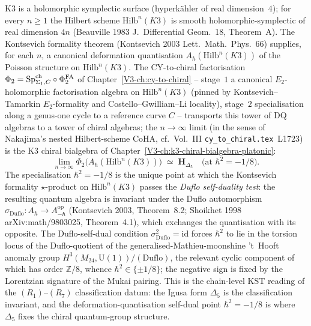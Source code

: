 \begin{remark}
\label{rem:mc5clmp-kst-dq}
\ClaimStatusConditional
K3 is a holomorphic symplectic surface (hyperk\"ahler of real
dimension~$4$); for every $n\ge 1$ the Hilbert scheme $\mathrm{Hilb}^n(K3)$
is smooth holomorphic-symplectic of real dimension $4n$
(Beauville 1983 \textup{J.~Differential Geom.}~18, Theorem~A). The
Kontsevich formality theorem (Kontsevich 2003
\textup{Lett.~Math.~Phys.}~66) supplies, for each $n$, a canonical
deformation quantisation $A_\hbar(\mathrm{Hilb}^n(K3))$ of the Poisson
structure on $\mathrm{Hilb}^n(K3)$. The CY-to-chiral factorisation
$\Phi_2 = \mathrm{Sp}^{\mathrm{ch}}_{\Sigma_1, C} \circ \Phi^{\mathrm{FA}}_2$ of
Chapter~\ref{V3-ch:cy-to-chiral} -- stage~$1$ a canonical
$E_2$-holomorphic factorisation algebra on $\mathrm{Hilb}^n(K3)$
(pinned by Kontsevich--Tamarkin $E_2$-formality and
Costello--Gwilliam--Li locality), stage~$2$ specialisation along a
genus-one cycle to a reference curve $C$ -- transports this tower
of DQ algebras to a tower of chiral algebras; the $n\to\infty$ limit
(in the sense of Nakajima's nested Hilbert-scheme CoHA,
cf.\ Vol.~III \texttt{cy\_to\_chiral.tex}~L1723) is the K3 chiral
bialgebra of Chapter~\ref{V3-ch:k3-chiral-bialgebra-platonic}:
\[
 \lim_{n\to\infty}
 \Phi_2\bigl(A_\hbar(\mathrm{Hilb}^n(K3))\bigr)
 \;\simeq\;
 \mathbf{H}_{\Delta_5}
 \quad\text{(at }\hbar^2 = -1/8\text{)}.
\]
The specialisation $\hbar^2 = -1/8$ is the unique point at which the
Kontsevich formality $\star$-product on
$\mathrm{Hilb}^n(K3)$ passes the
\emph{Duflo self-duality test}: the resulting quantum algebra is
invariant under the Duflo automorphism
$\sigma_{\mathrm{Duflo}}\colon A_\hbar \to A_{-\hbar}^{\mathrm{op}}$
(Kontsevich 2003, Theorem~8.2; Shoikhet 1998
\textup{arXiv:math/9803025}, Theorem~4.1), which exchanges the
quantisation with its opposite. The Duflo-self-dual condition
$\sigma_{\mathrm{Duflo}}^2 = \mathrm{id}$ forces $\hbar^2$ to lie in
the torsion locus of the Duflo-quotient of the generalised-Mathieu-moonshine
't~Hooft anomaly group $H^3(M_{24},\mathrm{U}(1))/(\text{Duflo})$, the
relevant cyclic component of which has order $\mathbb{Z}/8$,
whence $\hbar^2 \in \{\pm 1/8\}$; the negative sign is fixed by the
Lorentzian signature of the Mukai pairing. This is the chain-level
KST reading of the $(R_1)$--$(R_7)$ classification datum: the Igusa
form $\Delta_5$ is the classification invariant, and the
deformation-quantisation self-dual point $\hbar^2=-1/8$ is where
$\Delta_5$ fixes the chiral quantum-group structure.


\end{remark}

